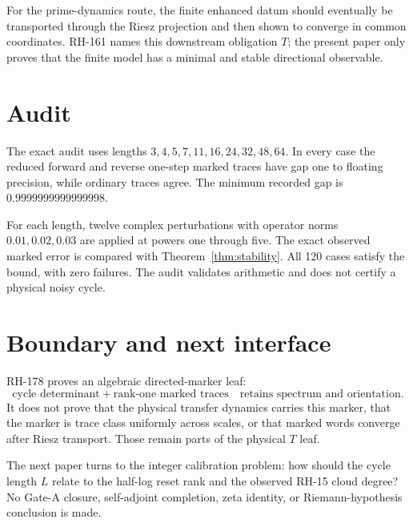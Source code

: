 \documentclass[12pt]{article}
\theoremstyle{remark}
\begin{document}
For the prime-dynamics route, the finite enhanced datum should eventually be
transported through the Riesz projection and then shown to converge in common
coordinates.  RH-161 names this downstream obligation $T$; the present paper
only proves that the finite model has a minimal and stable directional
observable.

\section{Audit}

The exact audit uses lengths
$3,4,5,7,11,16,24,32,48,64$.  In every case the reduced forward and reverse
one-step marked traces have gap one to floating precision, while ordinary
traces agree.  The minimum recorded gap is
$0.9999999999999998$.

For each length, twelve complex perturbations with operator norms
$0.01,0.02,0.03$ are applied at powers one through five.  The exact observed
marked error is compared with Theorem~\ref{thm:stability}.  All 120 cases
satisfy the bound, with zero failures.  The audit validates arithmetic and
does not certify a physical noisy cycle.

\section{Boundary and next interface}

RH-178 proves an algebraic directed-marker leaf:
\[
 \text{cycle determinant} + \text{rank-one marked traces}
 \quad\text{retains spectrum and orientation}.
\]
It does not prove that the physical transfer dynamics carries this marker,
that the marker is trace class uniformly across scales, or that marked words
converge after Riesz transport.  Those remain parts of the physical $T$ leaf.

The next paper turns to the integer calibration problem: how should the cycle
length $L$ relate to the half-log reset rank and the observed RH-15 cloud
degree?  No Gate-A closure, self-adjoint completion, zeta identity, or
Riemann-hypothesis conclusion is made.



\end{document}
